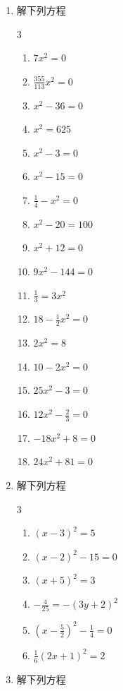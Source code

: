 \begin{enumerate}
    \item 解下列方程
\begin{multicols}{3}
\begin{enumerate}
    \item  $7 x^{2}=0$
    \item  $\frac{355}{113} x^{2}=0$
    \item  $x^{2}-36=0$
    \item  $x^{2}=625$
    \item  $x^{2}-3=0$
    \item  $x^{2}-15=0$
    \item  $\frac{1}{4}-x^{2}=0$ 
    \item  $x^{2}-20=100$
    \item  $x^{2}+12=0$
    \item  $9 x^{2}-144=0$
    \item  $\frac{1}{3}=3 x^{2}$
    \item $18-\frac{1}{2} x^{2}=0$
    \item  $2 x^{2}=8$
    \item  $10-2 x^{2}=0$
    \item  $25 x^{2}-3=0$
    \item  $12 x^{2}-\frac{2}{3}=0$
    \item  $-18 x^{2}+8=0$
    \item  $24 x^{2}+81=0$
\end{enumerate}
\end{multicols}
    \item 解下列方程
    \begin{multicols}{3}
        \begin{enumerate}
\item  $(x-3)^{2}=5$
    \item $(x-2)^{2}-15=0$
    \item  $(x+5)^{2}=3$
    \item  $-\frac{4}{25}=-(3 y+2)^{2}$
    \item  $\left(x-\frac{5}{2}\right)^{2}-\frac{1}{4}=0$
    \item  $ \frac{1}{6}(2 x+1)^{2}=2$
        \end{enumerate}
    \end{multicols}
    \item 解下列方程
  

\end{enumerate}
